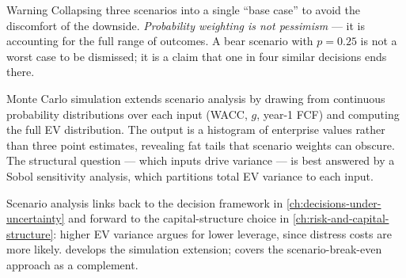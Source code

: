 \begin{admonition}{Warning}
Collapsing three scenarios into a single ``base case'' to avoid the discomfort of
the downside. \emph{Probability weighting is not pessimism} --- it is accounting
for the full range of outcomes. A bear scenario with \(p=0.25\) is not a worst
case to be dismissed; it is a claim that one in four similar decisions ends there.
\end{admonition}

Monte Carlo simulation extends scenario analysis by drawing from continuous probability
distributions over each input (WACC, \(g\), year-1 FCF) and computing the full EV
distribution. The output is a histogram of enterprise values rather than three point
estimates, revealing fat tails that scenario weights can obscure. The structural question
--- which inputs drive variance --- is best answered by a Sobol sensitivity analysis, which
partitions total EV variance to each input.

Scenario analysis links back to the decision framework in \cref{ch:decisions-under-uncertainty}
and forward to the capital-structure choice in \cref{ch:risk-and-capital-structure}:
higher EV variance argues for lower leverage, since distress costs are more likely.
\textcite{damodaran2012} develops the simulation extension; \textcite{brealey2020}
covers the scenario-break-even approach as a complement.
